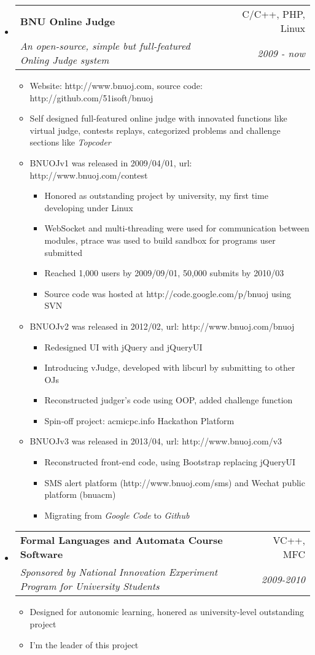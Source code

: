 \documentclass[letterpaper,11pt,UTF8,nofonts]{ctexart}
\makeatletter
\newcommand{\resitem}[1]{\item #1 \vspace{-2pt}}
\newcommand{\ressubheading}[4]{
    \begin{tabular*}{6.5in}{l@{\cftdotfill{\cftsecdotsep}\extracolsep{\fill}}r}
        \textbf{#1} & #2 \\
        \textit{#3} & \textit{#4} \\
    \end{tabular*}\vspace{-6pt}
}
\makeatother
\begin{document}
    \begin{itemize}
        \item
            \ressubheading{BNU Online Judge}{C/C++, PHP, Linux}{An open-source, simple but full-featured Onling Judge system}{2009 - now}
            \begin{itemize}
                \resitem{Website: http://www.bnuoj.com, source code: http://github.com/51isoft/bnuoj}
                \resitem{Self designed full-featured online judge with innovated functions like virtual judge, contests replays, categorized problems and challenge sections like {\it Topcoder} }
                \resitem{BNUOJv1 was released in 2009/04/01, url: http://www.bnuoj.com/contest}
                \begin{itemize}
                    \resitem{Honored as outstanding project by university, my first time developing under Linux}
                    \resitem{WebSocket and multi-threading were used for communication between modules, ptrace was used to build sandbox for programs user submitted}
                    \resitem{Reached 1,000 users by 2009/09/01, 50,000 submits by 2010/03}
                    \resitem{Source code was hosted at http://code.google.com/p/bnuoj using SVN}
                \end{itemize}
                \resitem{BNUOJv2 was released in 2012/02, url: http://www.bnuoj.com/bnuoj}
                \begin{itemize}
                    \resitem{Redesigned UI with jQuery and jQueryUI}
                    \resitem{Introducing vJudge, developed with libcurl by submitting to other OJs}
                    \resitem{Reconstructed judger's code using OOP, added challenge function}
                    \resitem{Spin-off project: acmicpc.info Hackathon Platform}
                \end{itemize}
                \resitem{BNUOJv3 was released in 2013/04, url: http://www.bnuoj.com/v3}
                \begin{itemize}
                    \resitem{Reconstructed front-end code, using Bootstrap replacing jQueryUI}
                    \resitem{SMS alert platform (http://www.bnuoj.com/sms) and Wechat public platform (bnuacm) }
                    \resitem{Migrating from {\it Google Code} to {\it Github}}
                \end{itemize}
            \end{itemize}
        \item
            \ressubheading{Formal Languages and Automata Course Software}{VC++, MFC}{Sponsored by National Innovation Experiment Program for University Students}{2009-2010}
            \begin{itemize}
                \resitem{Designed for autonomic learning, honered as university-level outstanding project}
                \resitem{I'm the leader of this project}
            \end{itemize}
    \end{itemize}
\end{document}
